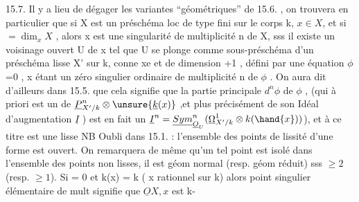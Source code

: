 15.7.   Il y a lieu de dégager les variantes ``géométriques'' de 15.6. ,
on trouvera en particulier que si X est un préschéma loc de type fini sur
le corps k, $x \in X$, et si  $= \dim_x X$ , alors  x est une singularité 
 de multiplicité  n de X, sss il existe un voisinage ouvert U de x
tel que U se plonge comme sous-préschéma d'un préschéma lisse X' sur k,
 conne xe et de dimension +1 , défini par une équation $\phi$=0 , x étant
un zéro  singulier ordinaire de multiplicité n de $\phi$ . On aura dit d'ailleurs
\margin{$\surd$} dans 15.5. que cela signifie  que  la  partie principale $d^n\phi$ de $\phi$ , 
 (qui à priori est un   de $\underline{P}^n_{X'/k}\otimes \unsure{\underline{k}(x)}$ ,et plus
précisément de son Idéal d'augmentation $\underline{I}$ )  est en fait un 
 $\underline{I}^n = \underline{Sym}^n_{\underline{O}_U}(\underline{\Omega}^1_{X'/k}\otimes k(\hand{x}))$), et  à ce titre est une   lisse 
\margin{|} \hand{[}NB Oubli dans 15.1. : l'ensemble des points de lissité d'une forme est
\margin{|} ouvert\hand{]}. On remarquera de même qu'un tel point est isolé dans l'ensemble
des points non lisses, il est géom normal  (resp. géom réduit) sss
 $\geqslant 2$  (resp.  $\geqslant 1$). Si  = 0 et k(x) = k ( x rationnel sur k) alors 
point singulier élémentaire  de mult\hand{,}  signifie que $\underline{O}X,x$  est  k-

